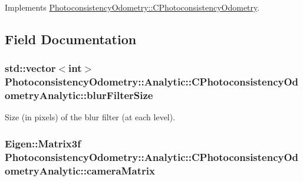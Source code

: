 Implements \hyperlink{class_photoconsistency_odometry_1_1_c_photoconsistency_odometry_ac22e57f7f5039b7988447e7bd7d77f89}{PhotoconsistencyOdometry::CPhotoconsistencyOdometry}.



\subsection{Field Documentation}
\hypertarget{class_photoconsistency_odometry_1_1_analytic_1_1_c_photoconsistency_odometry_analytic_abc3f7da046ef73b3cd4b8a4ad5abf441}{
\subsubsection[{blurFilterSize}]{\setlength{\rightskip}{0pt plus 5cm}std::vector$<$int$>$ {\bf PhotoconsistencyOdometry::Analytic::CPhotoconsistencyOdometryAnalytic::blurFilterSize}}}
\label{class_photoconsistency_odometry_1_1_analytic_1_1_c_photoconsistency_odometry_analytic_abc3f7da046ef73b3cd4b8a4ad5abf441}
Size (in pixels) of the blur filter (at each level). \hypertarget{class_photoconsistency_odometry_1_1_analytic_1_1_c_photoconsistency_odometry_analytic_a6338098cb3cee04a59768a27b84e29e0}{
\subsubsection[{cameraMatrix}]{\setlength{\rightskip}{0pt plus 5cm}Eigen::Matrix3f {\bf PhotoconsistencyOdometry::Analytic::CPhotoconsistencyOdometryAnalytic::cameraMatrix}}}
\label{class_photoconsistency_odometry_1_1_analytic_1_1_c_photoconsistency_odometry_analytic_a6338098cb3cee04a59768a27b84e29e0}

